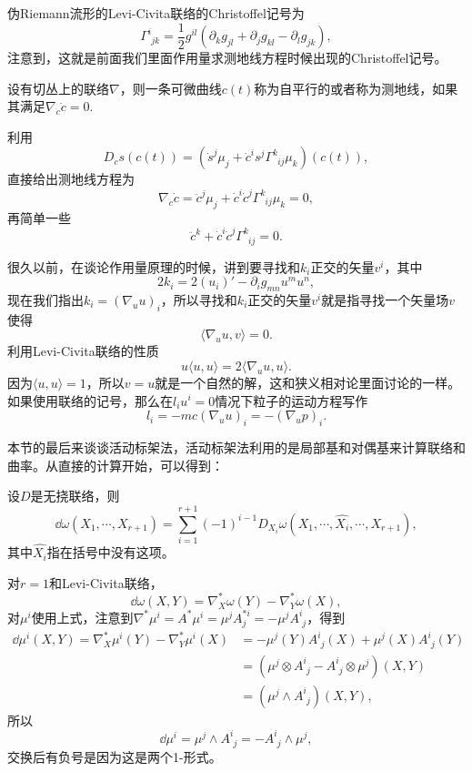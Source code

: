 伪Riemann流形的Levi-Civita联络的Christoffel记号为
\[
	\Gamma^i_{\phantom{i}jk}=\frac{1}{2}g^{il}(\partial_k g_{jl}+\partial_j g_{kl}-\partial_l g_{jk}),
\]
注意到，这就是前面我们里面作用量求测地线方程时候出现的Christoffel记号。

\begin{defi}
设有切丛上的联络$\nabla$，则一条可微曲线$c(t)$称为自平行的或者称为测地线，如果其满足$\nabla_{\dot{c}}\dot{c}=0$.
\end{defi}
利用
\[
D_{\dot{c}}s(c(t))=\left(\dot{s}^j\mu_j+\dot{c}^i s^j\Gamma^k_{\phantom{k}ij}\mu_k\right)(c(t)),
\]
直接给出测地线方程为
\[
\nabla_{\dot{c}}\dot{c}=\ddot{c}^j\mu_j+\dot{c}^i \dot{c}^j\Gamma^k_{\phantom{k}ij}\mu_k=0,
\]
再简单一些
\[
\ddot{c}^k+\dot{c}^i \dot{c}^j\Gamma^k_{\phantom{k}ij}=0.
\]

很久以前，在谈论作用量原理的时候，讲到要寻找和$k_i$正交的矢量$v^i$，其中
\[
	2k_i=2(u_i)'-\partial_ig_{mn}u^mu^n,
\]
现在我们指出$k_i=(\nabla_{u}u)_i$，所以寻找和$k_i$正交的矢量$v^i$就是指寻找一个矢量场$v$使得
\[
	\langle \nabla_{u}u,v\rangle=0.
\]
利用Levi-Civita联络的性质
\[
	u\langle u,u\rangle=2\langle \nabla_{u}u,u\rangle.
\]
因为$\langle u,u\rangle=1$，所以$v=u$就是一个自然的解，这和狭义相对论里面讨论的一样。如果使用联络的记号，那么在$l_iu^i=0$情况下粒子的运动方程写作
\[
	l_i=-mc(\nabla_{u}u)_i=-(\nabla_{u}p)_i.
\]

本节的最后来谈谈活动标架法，活动标架法利用的是局部基和对偶基来计算联络和曲率。从直接的计算开始，可以得到：
\begin{pro}
设$D$是无挠联络，则
\[
	\dd \omega(X_1,\cdots,X_{r+1})=\sum_{i=1}^{r+1}(-1)^{i-1}D_{X_i}\omega(X_1,\cdots,\hat{X_i},\cdots,X_{r+1}),
\]
其中$\hat{X_i}$指在括号中没有这项。
\end{pro}

对$r=1$和Levi-Civita联络，
\[
	\dd \omega(X,Y)=\nabla^*_{X}\omega(Y)-\nabla^*_{Y}\omega(X),
\]
对$\mu^i$使用上式，注意到$\nabla^*\mu^i=A^*\mu^i=\mu^jA^{*i}_j=-\mu^jA^i_{\phantom{i}j}$，得到
\begin{align*}
	\dd \mu^i(X,Y)=\nabla^*_{X}\mu^i(Y)-\nabla^*_{Y}\mu^i(X)&=-\mu^j(Y)A^i_{\phantom{i}j}(X)+\mu^j(X)A^i_{\phantom{i}j}(Y)\\
	&=(\mu^j\otimes A^i_{\phantom{i}j}-A^i_{\phantom{i}j}\otimes \mu^j)(X,Y)\\
	&=(\mu^j\wedge A^i_{\phantom{i}j})(X,Y),
\end{align*}
所以
\begin{equation}
	\dd \mu^i=\mu^j\wedge A^i_{\phantom{i}j}=-A^i_{\phantom{i}j}\wedge \mu^j,
	\label{cartan1}
\end{equation}
交换后有负号是因为这是两个1-形式。


